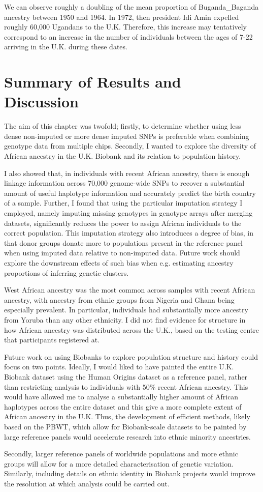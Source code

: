 We can observe roughly a doubling of the mean proportion of  Buganda\_Baganda ancestry between 1950 and 1964. In 1972, then president Idi Amin expelled roughly 60,000 Ugandans to the U.K. Therefore, this increase may tentatively correspond to an increase in the number of individuals between the ages of 7-22 arriving in the U.K. during these dates. 

\section{Summary of Results and Discussion} 

The aim of this chapter was twofold; firstly, to determine whether using less dense non-imputed or more dense imputed SNPs is preferable when combining genotype data from multiple chips. Secondly, I wanted to explore the diversity of African ancestry in the U.K. Biobank and its relation to population history.  

I also showed that, in individuals with recent African ancestry, there is enough linkage information across 70,000 genome-wide SNPs to recover a substantial amount of useful haplotype information and accurately predict the birth country of a sample. Further, I found that using the particular imputation strategy I employed, namely imputing missing genotypes in genotype arrays after merging datasets, significantly reduces the power to assign African individuals to the correct population. This imputation strategy also introduces a degree of bias, in that donor groups donate more to populations present in the reference panel when using imputed data relative to non-imputed data. Future work should explore the downstream effects of such bias when e.g. estimating ancestry proportions of inferring genetic clusters. 

West African ancestry was the most common across samples with recent African ancestry, with ancestry from ethnic groups from Nigeria and Ghana being especially prevalent. In particular, individuals had substantially more ancestry from Yoruba than any other ethnicity. I did not find evidence for structure in how African ancestry was distributed across the U.K., based on the testing centre that participants registered at. 

Future work on using Biobanks to explore population structure and history could focus on two points.
Ideally, I would liked to have painted the entire U.K. Biobank dataset using the Human Origins dataset as a reference panel, rather than restricting analysis to individuals with 50\% recent African ancestry. This would have allowed me to analyse a substantially higher amount of African haplotypes across the entire dataset and this give a more complete extent of African ancestry in the U.K. Thus, the development of efficient methods, likely based on the PBWT, which allow for Biobank-scale datasets to be painted by large reference panels would accelerate research into ethnic minority ancestries. 

Secondly, larger reference panels of worldwide populations and more ethnic groups will allow for a more detailed characterisation of genetic variation.  Similarly, including details on ethnic identity in Biobank projects would improve the resolution at which analysis could be carried out.  



